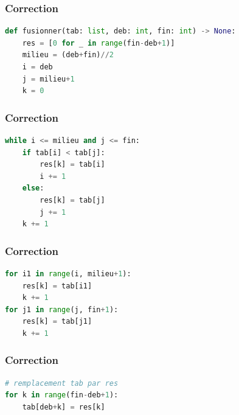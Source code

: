 \documentclass[svgnames,11pt]{beamer}
\begin{document}
\begin{frame}[fragile]
    \frametitle{Correction}

    \begin{center}
        \begin{lstlisting}[language=Python , basicstyle=\ttfamily\small, xleftmargin=1em, xrightmargin=1em]
def fusionner(tab: list, deb: int, fin: int) -> None:
    res = [0 for _ in range(fin-deb+1)]
    milieu = (deb+fin)//2
    i = deb
    j = milieu+1
    k = 0
\end{lstlisting}
        \label{CODE}
    \end{center}

\end{frame}
\begin{frame}[fragile]
    \frametitle{Correction}

    \begin{center}
        \begin{lstlisting}[language=Python , basicstyle=\ttfamily\small, xleftmargin=1em, xrightmargin=1em]
while i <= milieu and j <= fin:
    if tab[i] < tab[j]:
        res[k] = tab[i]
        i += 1
    else:
        res[k] = tab[j]
        j += 1
    k += 1
\end{lstlisting}
        \label{CODE}
    \end{center}

\end{frame}
\begin{frame}[fragile]
    \frametitle{Correction}

    \begin{center}
        \begin{lstlisting}[language=Python , basicstyle=\ttfamily\small, xleftmargin=1em, xrightmargin=1em]
for i1 in range(i, milieu+1):
    res[k] = tab[i1]
    k += 1
for j1 in range(j, fin+1):
    res[k] = tab[j1]
    k += 1
\end{lstlisting}
        \label{CODE}
    \end{center}

\end{frame}
\begin{frame}[fragile]
    \frametitle{Correction}

    \begin{center}
        \begin{lstlisting}[language=Python , basicstyle=\ttfamily\small, xleftmargin=1em, xrightmargin=1em]
# remplacement tab par res
for k in range(fin-deb+1):
    tab[deb+k] = res[k]
\end{lstlisting}
        \label{CODE}
    \end{center}

\end{frame}
\end{document}
